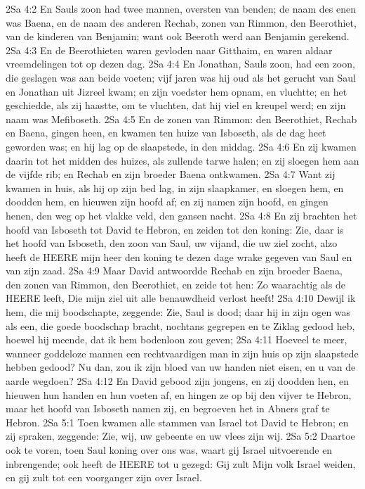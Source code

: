 2Sa 4:2  En Sauls zoon had twee mannen, oversten van benden; de naam des enen was Baena, en de naam des anderen Rechab, zonen van Rimmon, den Beerothiet, van de kinderen van Benjamin; want ook Beeroth werd aan Benjamin gerekend.
2Sa 4:3  En de Beerothieten waren gevloden naar Gitthaim, en waren aldaar vreemdelingen tot op dezen dag.
2Sa 4:4  En Jonathan, Sauls zoon, had een zoon, die geslagen was aan beide voeten; vijf jaren was hij oud als het gerucht van Saul en Jonathan uit Jizreel kwam; en zijn voedster hem opnam, en vluchtte; en het geschiedde, als zij haastte, om te vluchten, dat hij viel en kreupel werd; en zijn naam was Mefiboseth.
2Sa 4:5  En de zonen van Rimmon: den Beerothiet, Rechab en Baena, gingen heen, en kwamen ten huize van Isboseth, als de dag heet geworden was; en hij lag op de slaapstede, in den middag.
2Sa 4:6  En zij kwamen daarin tot het midden des huizes, als zullende tarwe halen; en zij sloegen hem aan de vijfde rib; en Rechab en zijn broeder Baena ontkwamen.
2Sa 4:7  Want zij kwamen in huis, als hij op zijn bed lag, in zijn slaapkamer, en sloegen hem, en doodden hem, en hieuwen zijn hoofd af; en zij namen zijn hoofd, en gingen henen, den weg op het vlakke veld, den gansen nacht.
2Sa 4:8  En zij brachten het hoofd van Isboseth tot David te Hebron, en zeiden tot den koning: Zie, daar is het hoofd van Isboseth, den zoon van Saul, uw vijand, die uw ziel zocht, alzo heeft de HEERE mijn heer den koning te dezen dage wrake gegeven van Saul en van zijn zaad.
2Sa 4:9  Maar David antwoordde Rechab en zijn broeder Baena, den zonen van Rimmon, den Beerothiet, en zeide tot hen: Zo waarachtig als de HEERE leeft, Die mijn ziel uit alle benauwdheid verlost heeft!
2Sa 4:10  Dewijl ik hem, die mij boodschapte, zeggende: Zie, Saul is dood; daar hij in zijn ogen was als een, die goede boodschap bracht, nochtans gegrepen en te Ziklag gedood heb, hoewel hij meende, dat ik hem bodenloon zou geven;
2Sa 4:11  Hoeveel te meer, wanneer goddeloze mannen een rechtvaardigen man in zijn huis op zijn slaapstede hebben gedood? Nu dan, zou ik zijn bloed van uw handen niet eisen, en u van de aarde wegdoen?
2Sa 4:12  En David gebood zijn jongens, en zij doodden hen, en hieuwen hun handen en hun voeten af, en hingen ze op bij den vijver te Hebron, maar het hoofd van Isboseth namen zij, en begroeven het in Abners graf te Hebron.
2Sa 5:1  Toen kwamen alle stammen van Israel tot David te Hebron; en zij spraken, zeggende: Zie, wij, uw gebeente en uw vlees zijn wij.
2Sa 5:2  Daartoe ook te voren, toen Saul koning over ons was, waart gij Israel uitvoerende en inbrengende; ook heeft de HEERE tot u gezegd: Gij zult Mijn volk Israel weiden, en gij zult tot een voorganger zijn over Israel.
